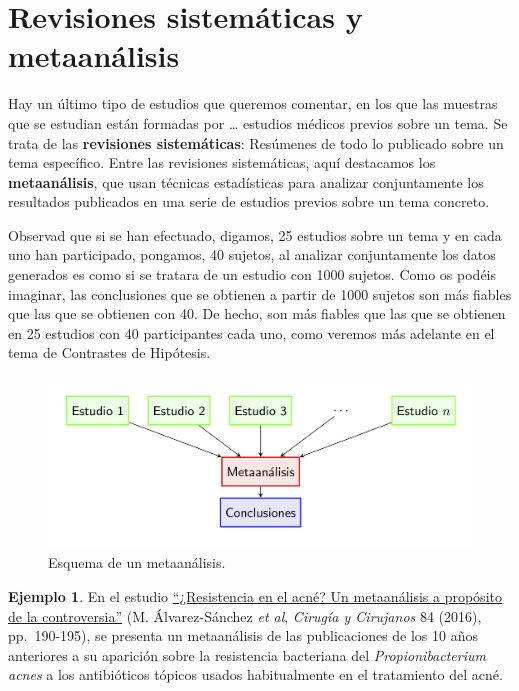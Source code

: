 \documentclass[
]{book}
\theoremstyle{definition}
\theoremstyle{definition}
\newtheorem{example}{Ejemplo}[chapter]
\theoremstyle{definition}
\theoremstyle{definition}
\theoremstyle{remark}
\begin{document}
\hypertarget{revisiones-sistemuxe1ticas-y-metaanuxe1lisis}{%
\section{Revisiones sistemáticas y metaanálisis}\label{revisiones-sistemuxe1ticas-y-metaanuxe1lisis}}

Hay un último tipo de estudios que queremos comentar, en los que las muestras que se estudian están formadas por \ldots{} estudios médicos previos sobre un tema. Se trata de las \textbf{revisiones sistemáticas}: Resúmenes de todo lo publicado sobre un tema específico. Entre las revisiones sistemáticas, aquí destacamos los \textbf{metaanálisis}, que usan técnicas estadísticas para analizar conjuntamente los resultados publicados en una serie de estudios previos sobre un tema concreto.

\begin{rmdnote}
Observad que si se han efectuado, digamos, 25 estudios sobre un tema y en cada uno han participado, pongamos, 40 sujetos, al analizar conjuntamente los datos generados es como si se tratara de un estudio con 1000 sujetos. Como os podéis imaginar, las conclusiones que se obtienen a partir de 1000 sujetos son más fiables que las que se obtienen con 40. De hecho, son más fiables que las que se obtienen en 25 estudios con 40 participantes cada uno, como veremos más adelante en el tema de Contrastes de Hipótesis.
\end{rmdnote}

\begin{figure}

{\centering \includegraphics[width=0.8\linewidth]{INREMDN_files/figure-html/metaanalisis} 

}

\caption{Esquema de un metaanálisis.}\label{fig:metaanálisis}
\end{figure}

\begin{example}
\protect\hypertarget{exm:acné}{}\label{exm:acné}En el estudio \href{https://www.sciencedirect.com/science/article/pii/S0009741115002364}{``¿Resistencia en el acné? Un metaanálisis a propósito de la controversia''} (M. Álvarez-Sánchez \emph{et al}, \emph{Cirugía y Cirujanos} 84 (2016), pp.~190-195), se presenta un metaanálisis de las publicaciones de los 10 años anteriores a su aparición sobre la resistencia bacteriana del \emph{Propionibacterium acnes} a los antibióticos tópicos usados habitualmente en el tratamiento del acné.
\end{example}
\end{document}
